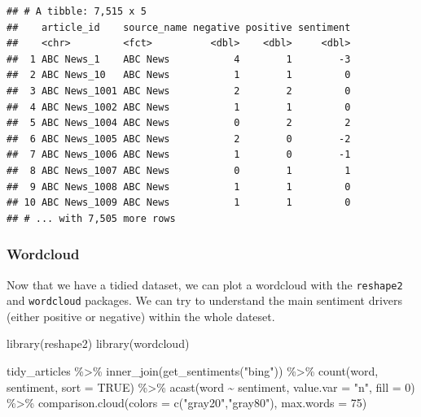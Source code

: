 \documentclass[
]{article}
\newenvironment{Shaded}{\begin{snugshade}}{\end{snugshade}}
\newcommand{\AttributeTok}[1]{\textcolor[rgb]{0.77,0.63,0.00}{#1}}
\newcommand{\ConstantTok}[1]{\textcolor[rgb]{0.00,0.00,0.00}{#1}}
\newcommand{\DecValTok}[1]{\textcolor[rgb]{0.00,0.00,0.81}{#1}}
\newcommand{\FunctionTok}[1]{\textcolor[rgb]{0.00,0.00,0.00}{#1}}
\newcommand{\NormalTok}[1]{#1}
\newcommand{\SpecialCharTok}[1]{\textcolor[rgb]{0.00,0.00,0.00}{#1}}
\newcommand{\StringTok}[1]{\textcolor[rgb]{0.31,0.60,0.02}{#1}}
\begin{document}
\begin{verbatim}
## # A tibble: 7,515 x 5
##    article_id    source_name negative positive sentiment
##    <chr>         <fct>          <dbl>    <dbl>     <dbl>
##  1 ABC News_1    ABC News           4        1        -3
##  2 ABC News_10   ABC News           1        1         0
##  3 ABC News_1001 ABC News           2        2         0
##  4 ABC News_1002 ABC News           1        1         0
##  5 ABC News_1004 ABC News           0        2         2
##  6 ABC News_1005 ABC News           2        0        -2
##  7 ABC News_1006 ABC News           1        0        -1
##  8 ABC News_1007 ABC News           0        1         1
##  9 ABC News_1008 ABC News           1        1         0
## 10 ABC News_1009 ABC News           1        1         0
## # ... with 7,505 more rows
\end{verbatim}

\hypertarget{wordcloud}{%
\subsubsection{Wordcloud}\label{wordcloud}}

Now that we have a tidied dataset, we can plot a wordcloud with the
\texttt{reshape2} and \texttt{wordcloud} packages. We can try to
understand the main sentiment drivers (either positive or negative)
within the whole dateset.

\begin{Shaded}
\begin{Highlighting}[]
\FunctionTok{library}\NormalTok{(reshape2)}
\FunctionTok{library}\NormalTok{(wordcloud)}

\NormalTok{tidy\_articles }\SpecialCharTok{\%\textgreater{}\%}
  \FunctionTok{inner\_join}\NormalTok{(}\FunctionTok{get\_sentiments}\NormalTok{(}\StringTok{"bing"}\NormalTok{)) }\SpecialCharTok{\%\textgreater{}\%}
  \FunctionTok{count}\NormalTok{(word, sentiment, }\AttributeTok{sort =} \ConstantTok{TRUE}\NormalTok{) }\SpecialCharTok{\%\textgreater{}\%}
  \FunctionTok{acast}\NormalTok{(word }\SpecialCharTok{\textasciitilde{}}\NormalTok{ sentiment, }\AttributeTok{value.var =} \StringTok{"n"}\NormalTok{, }\AttributeTok{fill =} \DecValTok{0}\NormalTok{) }\SpecialCharTok{\%\textgreater{}\%}
  \FunctionTok{comparison.cloud}\NormalTok{(}\AttributeTok{colors =} \FunctionTok{c}\NormalTok{(}\StringTok{"gray20"}\NormalTok{,}\StringTok{"gray80"}\NormalTok{), }\AttributeTok{max.words =} \DecValTok{75}\NormalTok{)}
\end{Highlighting}
\end{Shaded}
\end{document}
